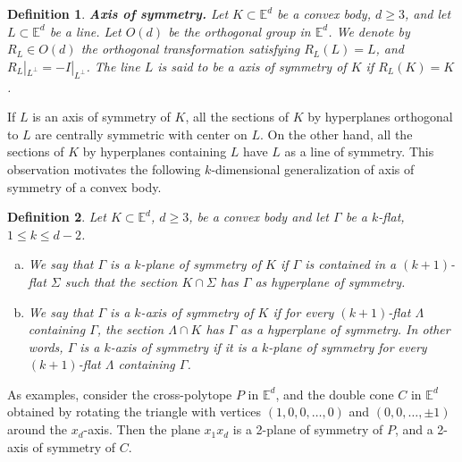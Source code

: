 \documentclass[12pt,thmsa]{amsart}
\newcommand{\Ed}{\mathbb{E}^{d}}
\newtheorem{definition}{Definition}
\begin{document}
\begin{definition}\label{axsym}\textbf{Axis of symmetry.} Let $K \subset \Ed$ be a convex body, $d\geq 3$, and let $L \subset \Ed$ be a line. Let $O(d)$ be the orthogonal group in $\Ed$. We denote by $R_{L}\in O(d)$ the orthogonal transformation satisfying $R_L(L)=L$, and $R_L|_{L^\perp}=-I|_{L^\perp}$.
The line $L$ is said to be a \textit{axis of symmetry of} $K$ if $R_{L}(K)=K$.
\end{definition}

If $L$ is an axis of symmetry of $K$,  all the sections of  $K$ by hyperplanes orthogonal to $L$ are centrally symmetric with center on $L$. On the other hand, all the sections of $K$ by hyperplanes containing $L$ have $L$ as a line of symmetry. This observation motivates the following $k$-dimensional generalization of axis of symmetry of a convex body.

\begin{definition}\label{kaxes}
Let $K \subset \Ed$, $d\geq 3$, be a convex body and let $\Gamma$ be a $k$-flat, $1\leq k \leq d-2$.
\begin{enumerate}[(a)]

\item We say that $\Gamma$ is a $k$-\textit{plane of symmetry} of $K$ if $\Gamma$ is contained in a $(k+1)$-flat $\Sigma$ such that the section $K \cap \Sigma$ has $\Gamma$ as hyperplane of symmetry. 

\item  We say that $\Gamma$ is  a $k$-\textit{axis of symmetry} of $K$ if for every $(k+1)$-flat $\Lambda$ containing $\Gamma$, the section $\Lambda \cap K$ has $\Gamma$ as a hyperplane of symmetry.  In other words,  $\Gamma$ is  a $k$-axis of symmetry if it is 
a $k$-plane of symmetry for every $(k+1)$-flat $\Lambda$ containing $\Gamma$.

\end{enumerate}
\end{definition}



As examples, consider the cross-polytope $P$ in $\Ed$, and the double cone $C$ in $\Ed$ obtained by rotating the triangle with vertices $(1,0,0, \ldots,0)$ and $(0,0,\ldots,\pm 1)$ around the $x_d$-axis. Then the plane $x_1 x_d$ is a 2-plane of symmetry of $P$, and a 2-axis of symmetry of $C$. 


\end{document}
